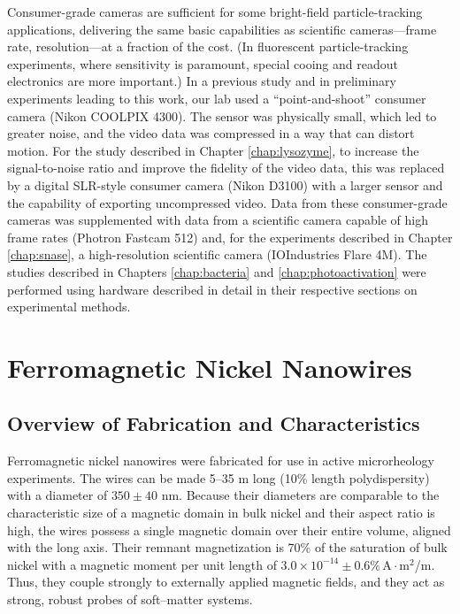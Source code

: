 Consumer-grade cameras are sufficient for some bright-field particle-tracking applications, delivering the same basic capabilities as scientific cameras---frame rate, resolution---at a fraction of the cost. (In fluorescent particle-tracking experiments, where sensitivity is paramount, special cooing and readout electronics are more important.) In a previous study and in preliminary experiments leading to this work, our lab used a ``point-and-shoot'' consumer camera (Nikon COOLPIX 4300). The sensor was physically small, which led to greater noise, and the video data was compressed in a way that can distort motion. For the study described in Chapter \ref{chap:lysozyme}, to increase the signal-to-noise ratio and improve the fidelity of the video data, this was replaced by a digital SLR-style consumer camera (Nikon D3100) with a larger sensor and the capability of exporting uncompressed video. Data from these consumer-grade cameras was supplemented with data from a scientific camera capable of high frame rates (Photron Fastcam 512) and, for the experiments described in Chapter \ref{chap:snase}, a high-resolution scientific camera (IOIndustries Flare 4M). The studies described in Chapters \ref{chap:bacteria} and \ref{chap:photoactivation} were performed using hardware described in detail in their respective sections on experimental methods.

\section{Ferromagnetic Nickel Nanowires}

\subsection{Overview of Fabrication and Characteristics}

Ferromagnetic nickel nanowires were fabricated for use in active microrheology experiments. The wires can be made 5--35 \textmu m long (10\% length polydispersity\cite{Hultgren2004,Hultgren2005}) with a diameter of $350 \pm 40$ nm\cite{Hultgren2004,Hultgren2005}. Because their diameters are comparable to the characteristic size of a magnetic domain in bulk nickel and their aspect ratio is high, the wires possess a single magnetic domain over their entire volume, aligned with the long axis. Their remnant magnetization is 70\% of the saturation of bulk nickel\cite{Sun1999} with a magnetic moment per unit length of $3.0 \times 10^{-14}\pm0.6\% \,\text{A}\cdot\text{m}^2$/\textmu m. Thus, they couple strongly to externally applied magnetic fields, and they act as strong, robust probes of soft--matter systems.

